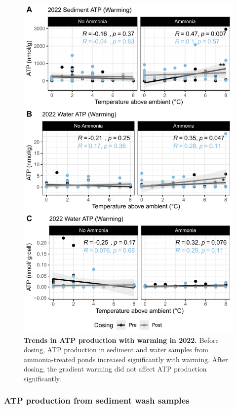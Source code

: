 \begin{figure}[H]
    \centering
    \includegraphics[scale=1]{./Figures/Regression_ATP}
    \caption{\textbf{Trends in ATP production with warming in 2022.} Before dosing, ATP production in sediment and water samples from ammonia-treated ponds increased significantly with warming. After dosing, the gradient warming did not affect ATP production significantly.}
    \label{fig:ATP2022Regression}
\end{figure}

\subsubsection{ATP production from sediment wash samples}

